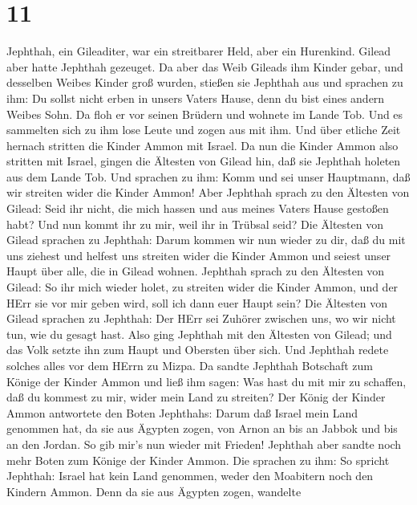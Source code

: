 \hypertarget{section-10}{%
\section{11}\label{section-10}}

 Jephthah, ein Gileaditer, war ein streitbarer Held, aber
ein Hurenkind. Gilead aber hatte Jephthah gezeuget.  Da aber
das Weib Gileads ihm Kinder gebar, und desselben Weibes Kinder groß
wurden, stießen sie Jephthah aus und sprachen zu ihm: Du sollst nicht
erben in unsers Vaters Hause, denn du bist eines andern Weibes Sohn.
 Da floh er vor seinen Brüdern und wohnete im Lande Tob. Und
es sammelten sich zu ihm lose Leute und zogen aus mit ihm. 
Und über etliche Zeit hernach stritten die Kinder Ammon mit Israel.
 Da nun die Kinder Ammon also stritten mit Israel, gingen
die Ältesten von Gilead hin, daß sie Jephthah holeten aus dem Lande Tob.
 Und sprachen zu ihm: Komm und sei unser Hauptmann, daß wir
streiten wider die Kinder Ammon!  Aber Jephthah sprach zu
den Ältesten von Gilead: Seid ihr nicht, die mich hassen und aus meines
Vaters Hause gestoßen habt? Und nun kommt ihr zu mir, weil ihr in
Trübsal seid?  Die Ältesten von Gilead sprachen zu Jephthah:
Darum kommen wir nun wieder zu dir, daß du mit uns ziehest und helfest
uns streiten wider die Kinder Ammon und seiest unser Haupt über alle,
die in Gilead wohnen.  Jephthah sprach zu den Ältesten von
Gilead: So ihr mich wieder holet, zu streiten wider die Kinder Ammon,
und der HErr sie vor mir geben wird, soll ich dann euer Haupt sein?
 Die Ältesten von Gilead sprachen zu Jephthah: Der HErr sei
Zuhörer zwischen uns, wo wir nicht tun, wie du gesagt hast.
 Also ging Jephthah mit den Ältesten von Gilead; und das
Volk setzte ihn zum Haupt und Obersten über sich. Und Jephthah redete
solches alles vor dem HErrn zu Mizpa.  Da sandte Jephthah
Botschaft zum Könige der Kinder Ammon und ließ ihm sagen: Was hast du
mit mir zu schaffen, daß du kommest zu mir, wider mein Land zu streiten?
 Der König der Kinder Ammon antwortete den Boten Jephthahs:
Darum daß Israel mein Land genommen hat, da sie aus Ägypten zogen, von
Arnon an bis an Jabbok und bis an den Jordan. So gib mir's nun wieder
mit Frieden!  Jephthah aber sandte noch mehr Boten zum
Könige der Kinder Ammon.  Die sprachen zu ihm: So spricht
Jephthah: Israel hat kein Land genommen, weder den Moabitern noch den
Kindern Ammon.  Denn da sie aus Ägypten zogen, wandelte
